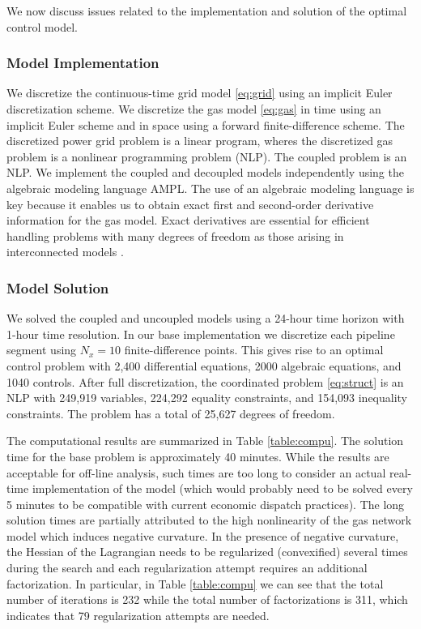 \documentclass[11pt,twoside]{article}
\begin{document}
We now discuss issues related to the implementation and solution of the optimal control model. 

\subsubsection{Model Implementation}

We discretize the continuous-time grid model \eqref{eq:grid} using an implicit Euler discretization scheme. We discretize the gas model \eqref{eq:gas} in time using an implicit Euler scheme and in space using a forward finite-difference scheme. The discretized power grid problem is a linear program, wheres the discretized gas problem is a nonlinear programming problem (NLP).  The coupled problem is an NLP.  We implement the coupled and decoupled models independently using the algebraic modeling language AMPL. The use of an algebraic modeling language is key because it enables us to obtain exact first and second-order derivative information for the gas model.  Exact derivatives are essential for efficient handling problems with many degrees of freedom as those arising in interconnected models \cite{zavalapavia}. 


\subsubsection{Model Solution}

We solved the coupled and uncoupled models using a 24-hour time horizon with 1-hour time resolution. In our base implementation we discretize each pipeline segment using $N_x=10$ finite-difference points. This gives rise to an optimal control problem with 2,400 differential equations, 2000 algebraic equations, and 1040 controls.  After full discretization, the coordinated problem \eqref{eq:struct} is an NLP with 249,919 variables, 224,292 equality constraints, and 154,093 inequality constraints.  The problem has a total of 25,627 degrees of freedom. 

The computational results are summarized in Table \ref{table:compu}. The solution time for the base problem is approximately 40 minutes.  While the results are acceptable for off-line analysis, such times are too long to consider an actual real-time implementation of the model (which would probably need to be solved every 5 minutes to be compatible with current economic dispatch practices).  The long solution times are partially attributed to the high nonlinearity of the gas network model which induces negative curvature. In the presence of negative curvature, the Hessian of the Lagrangian needs to be regularized (convexified) several times during the search and each regularization attempt requires an additional factorization. In particular, in Table \ref{table:compu} we can see that the total number of iterations is 232 while the total number of factorizations is 311, which indicates that 79 regularization attempts are needed. 
\end{document}
